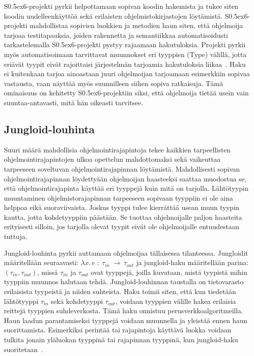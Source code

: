\documentclass[finnish]{tktltiki2}
\theoremstyle{definition}
\theoremstyle{remark}
\begin{document}
S\raise0.5ex\hbox{6}-projekti pyrkii helpottamaan sopivan koodin hakemista ja tukee siten koodin uudelleenkäyttöä sekä erilaisten ohjelmistokirjastojen löytämistä. S\raise0.5ex\hbox{6}-projekti mahdollistaa sopivien luokkien ja metodien haun siten, että ohjelmoija tarjoaa testitapauksia, joiden rakennetta ja semantiikkaa automatisoidusti tarkastelemalla S\raise0.5ex\hbox{6}-projekti pystyy rajaamaan hakutuloksia. Projekti pyrkii myös automatisoimaan tarvittavat muunnokset eri tyyppien (Type) välillä, jotta eriävät tyypit eivät rajoittaisi järjestelmän tarjoamia hakutuloksia liikaa~\cite{what-to-search-for}. Haku ei kuitenkaan tarjoa ainoastaan juuri ohjelmoijan tarjoamaan esimerkkiin sopivaa vastausta, vaan näyttää myös suunnilleen siihen sopiva ratkaisuja. Tämä ominaisuus on kehitetty S\raise0.5ex\hbox{6}-projektiin siksi, että ohjelmoija tietää usein vain suuntaa-antavasti, mitä hän oikeasti tarvitsee.

\subsection{Jungloid-louhinta}
Suuri määrä mahdollisia ohjelmointirajapintoja tekee kaikkien tarpeellisten ohjelmointirajapintojen ulkoa opettelun mahdottomaksi sekä vaikeuttaa tarpeeseen soveltuvan ohjelmointirajapinnan löytämistä. Mahdollisesti sopivan ohjelmointirajapinnan löydettyään ohjelmoijan haasteeksi saattaa muodostua se, että ohjelmointirajapinta käyttää eri tyyppejä kuin mitä on tarjolla. Lähtötyypin muuntaminen ohjelmistorajapinnan tarpeeseen sopivaan tyyppiin ei ole aina helppoa eikä suoraviivaista. Joskus tyyppi tulee kierrättää usean muun tyypin kautta, jotta kohdetyyppiin päästään. Se tuottaa ohjelmoijalle paljon haasteita erityisesti silloin, jos tarjolla olevat tyypit eivät ole ohjelmoijalle entuudestaan tuttuja.

Jungloid-louhinta pyrkii auttamaan ohjelmoijaa tällaisessa tilanteessa.
Jungloidit määritellään seuraavasti: $ \lambda x.\, e\; :\; \tau_{in}\:\to\:\tau_{out}$ ja jungloid-haku määritellään parina: $(\tau_{in}, \tau_{out})$, missä $\tau_{in}$ ja $\tau_{out}$ ovat tyyppejä, joilla kuvataan, mistä tyypistä mihin tyyppiin muunnos halutaan tehdä. Jungloid-louhinnan taustalla on tietovarasto erilaisista tyypeistä ja niiden suhteista. Haku toimii siten, että kun tiedetään lähtötyyppi $\tau_{in}$ sekä kohdetyyppi $\tau_{out}$, voidaan tyyppien välille hakea erilaisia reittejä tyyppien suhdeverkosta. Tämä haku onnistuu perusverkkoalgoritmeilla. Haun laadun parantamiseksi tyyppejä voidaan muunnella ja yleistää ennen haun suorittamista. Esimerkiksi perintää tai rajapintoja käyttävä luokka voidaan tulkita jonain yläluokan tyyppinä tai rajapinnan tyyppinä, kun jungloid-haku suoritetaan~\cite{jungloid-mining}.
\end{document}
